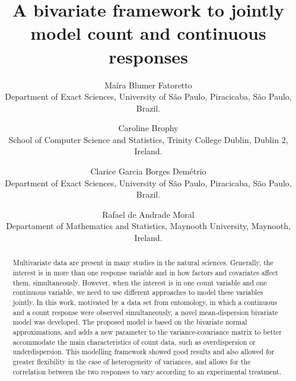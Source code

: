 \documentclass[useAMS,referee]{biom}
\title[A bivariate framework to jointly model count and continuous responses]{A bivariate framework to jointly model count and continuous responses}
\author
{Maíra Blumer Fatoretto\emailx{mairafatoretto@gmail.com} \\
Department of Exact Sciences, University of São Paulo, Piracicaba, São Paulo, Brazil.
\and
Caroline Brophy\emailx{caroline.brophy@tcd.ie} \\
School of Computer Science and Statistics, Trinity College Dublin, Dublin 2, Ireland.
\and
Clarice Garcia Borges Demétrio\emailx{clarice.demetrio@usp.br} \\
Department of Exact Sciences, University of São Paulo, Piracicaba, São Paulo, Brazil.
\and
Rafael de Andrade Moral\emailx{rafael.deandrademoral@mu.ie} \\
Departament of Mathematics and Statistics, Maynooth University, Maynooth, Ireland.}
\begin{document}







\label{firstpage}


\begin{abstract}
Multivariate data are present in many studies in the natural sciences. Generally, the interest is in more than one response variable and in how factors and covariates affect them, simultaneously. However, when the interest is in one count variable and one continuous variable, we need to use different approaches to model these variables jointly. In this work, motivated by a data set from entomology, in which a continuous and a count response were observed simultaneously, a novel mean-dispersion bivariate model was developed. The proposed model is based on the bivariate normal approximations, and adds a new parameter to the variance-covariance matrix to better accommodate the main characteristics of count data, such as overdispersion or underdispersion. This modelling framework showed good results and also allowed for greater flexibility in the case of heterogeneity of variances, and allows for the correlation between the two responses to vary according to an experimental treatment.
\end{abstract}
\end{document}
